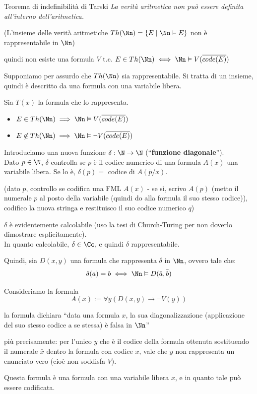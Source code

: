 \documentclass[a4paper,11pt]{report}
\begin{document}
\begin{thmframe}{Teorema di indefinibilità di Tarski}{}
\textit{La verità aritmetica non può essere definita all'interno dell'aritmetica.}

(L'insieme delle verità aritmetiche \( Th(\Nn) = \{E \mid \Nn \vDash E\} \) non è rappresentabile in \( \Nn \))

{\color{gray}quindi non esiste una formula \( V \) t.c.  \( E \in Th(\Nn) \iff \Nn \vDash V(\overline{code(E)})\)}
\end{thmframe}

Supponiamo per assurdo che \( Th(\Nn) \) sia rappresentabile.
Si tratta di un insieme, quindi è descritto da una formula con una variabile libera.

Sia \( T(x) \) la formula che lo rappresenta.
\begin{itemize}
    \item \( E \in Th(\Nn) \implies \Nn \vDash V(\overline{code(E)})\)
    \item \( E \not\in Th(\Nn) \implies \Nn \vDash \neg V(\overline{code(E)})\)
\end{itemize}

Introduciamo una nuova funzione \( \delta : \N \to \N \) (``\textbf{funzione diagonale}'').\\
Dato \( p\in \N \), \( \delta \) controlla se \( p \) è il codice numerico di una formula \( A(x) \) una variabile libera. Se lo è, \( \delta(p) =  \) codice di \( A(\bar{p}/x) \).

{\color{CadetBlue}(dato \( p\), controllo se codifica una FML \( A(x) \) - se sì, scrivo \( A(p) \) (metto il numerale \( p \) al posto della variabile {\small(quindi do alla formula il suo stesso codice)}), codifico la nuova stringa e restituisco il suo codice numerico \( q \))}

\( \delta \) è evidentemente calcolabile (uso la tesi di Church-Turing per non doverlo dimostrare esplicitamente).\\ In quanto calcolabile, \( \delta\in\Cc \), e quindi \( \delta \) rappresentabile.

Quindi, sia \( D(x, y) \) una formula che rappresenta \( \delta \) in \( \Nn \), ovvero tale che:
\[ \delta(a) = b \iff \Nn \vDash D(\bar{a}, \bar{b})\]

Consideriamo la formula
\[ A(x):= \forall y (D(x, y)\to \neg V(y)) \]

\begin{gframe}{}
la formula dichiara ``data una formula \( x \), la sua diagonalizzazione (applicazione del suo stesso codice a se stessa) è falsa in \( \Nn \)''

{\color{gray}\small
più precisamente: per l'unico \( y \) che è il codice della formula ottenuta sostituendo il numerale \(\bar{x}\) dentro la formula con codice \( x \), vale che \( y \) non rappresenta un enunciato vero (cioè non soddisfa \( V \)).}
\end{gframe}
Questa formula è una formula con una variabile libera \( x \), e in quanto tale può essere codificata.
\end{document}
